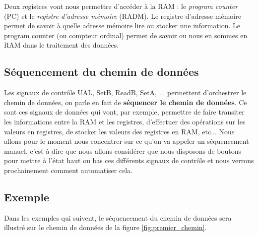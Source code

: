 Deux registres vont nous permettre d'accéder à la RAM : le \emph{program counter} (PC) et le \emph{registre d'adresse mémoire} (RADM). Le registre d'adresse mémoire permet de savoir à quelle adresse mémoire lire ou stocker une information. Le program counter (ou compteur ordinal) permet de savoir ou nous en sommes en RAM dans le traitement des données. 

\subsection{Séquencement du chemin de données}

Les signaux de contrôle UAL, SetB, ReadB, SetA, ... permettent d'orchestrer le chemin de données, on parle en fait de \textbf{séquencer le chemin de données}. Ce sont ces signaux de données qui vont, par exemple, permettre de faire transiter les informations entre la RAM et les registres, d'effectuer des opérations sur les valeurs en registres, de stocker les valeurs des registres en RAM, etc... Nous allons pour le moment nous concentrer sur ce qu'on va appeler un séquencement manuel, c'est à dire que nous allons considérer que nous disposons de boutons pour mettre à l'état haut ou bas ces différents signaux de contrôle et nous verrons prochainement comment automatiser cela.

\subsection{Exemple}

\label{sec:chemin_donnes_exemple}

Dans les exemples qui suivent, le séquencement du chemin de données sera illustré sur le chemin de données de la figure \ref{fig:premier_chemin}.

